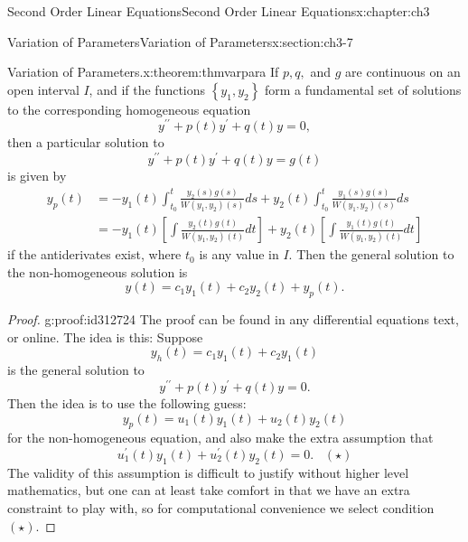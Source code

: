 \documentclass[oneside,10pt,]{book}
\numberwithin{equation}{section}
\numberwithin{equation}{section}
\newcommand{\amp}{&}
\begin{document}
\begin{chapterptx}{Second Order Linear Equations}{}{Second Order Linear Equations}{}{}{x:chapter:ch3}
\begin{sectionptx}{Variation of Parameters}{}{Variation of Parameters}{}{}{x:section:ch3-7}
\begin{theorem}{Variation of Parameters.}{}{x:theorem:thmvarpara}%
If \(p,q,\) and \(g\) are continuous on an open interval \(I\), and if the functions \(\left\{ y_{1},y_{2}\right\} \) form a fundamental set of solutions to the corresponding homogeneous equation%
\begin{equation*}
y^{\prime\prime}+p(t)y^{\prime}+q(t)y=0,
\end{equation*}
then a particular solution to%
\begin{equation*}
y^{\prime\prime}+p(t)y^{\prime}+q(t)y=g(t)
\end{equation*}
is given by%
\begin{align*}
y_{p}(t) \amp =-y_{1}(t)\int_{t_{0}}^{t}\frac{y_{2}(s)g(s)}{W\left(y_{1},y_{2}\right)(s)}ds+y_{2}(t)\int_{t_{0}}^{t}\frac{y_{1}(s)g(s)}{W\left(y_{1},y_{2}\right)(s)}ds\\
\amp =-y_{1}(t)\left[\int\frac{y_{2}(t)g(t)}{W\left(y_{1},y_{2}\right)(t)}dt\right]+y_{2}(t)\left[\int\frac{y_{1}(t)g(t)}{W\left(y_{1},y_{2}\right)(t)}dt\right]
\end{align*}
if the antiderivates exist, where \(t_{0}\) is any value in \(I\). Then the general solution to the non-homogeneous solution is%
\begin{equation*}
y(t)=c_{1}y_{1}(t)+c_{2}y_{2}(t)+y_{p}(t).
\end{equation*}
%
\end{theorem}
\begin{proof}{}{g:proof:id312724}
The proof can be found in any differential equations text, or online. The idea is this: Suppose%
\begin{equation*}
y_{h}(t)=c_{1}y_{1}(t)+c_{2}y_{1}(t)
\end{equation*}
is the general solution to%
\begin{equation*}
y^{\prime\prime}+p(t)y^{\prime}+q(t)y=0.
\end{equation*}
Then the idea is to use the following guess:%
\begin{equation*}
y_{p}(t)=u_{1}(t)y_{1}(t)+u_{2}(t)y_{2}(t)
\end{equation*}
for the non-homogeneous equation, and also make the extra assumption that%
\begin{equation*}
u_{1}^{\prime}(t)y_{1}(t)+u_{2}^{\prime}(t)y_{2}(t)=0.\,\,\,\,\,(\star)
\end{equation*}
The validity of this assumption is difficult to justify without higher level mathematics, but one can at least take comfort in that we have an extra constraint to play with, so for computational convenience we select condition \((\star)\).%

\end{proof}
\end{sectionptx}
\end{chapterptx}
\end{document}
